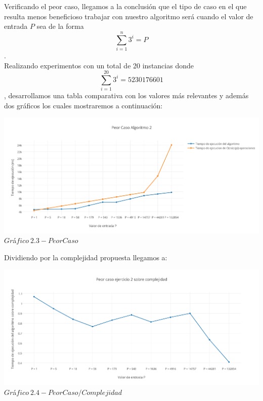 Verificando el peor caso, llegamos a la conclusi\'on que el tipo de caso en el que resulta menos beneficioso trabajar con nuestro algoritmo ser\'a cuando el valor de entrada $P$ sea de la forma \[
\sum_{i=1}^{n}3^{i}=P 
\].
\\

Realizando experimentos con un total de 20 instancias donde \[
\sum_{i=1}^{20}3^{i}=5230176601 
\], desarrollamos una tabla comparativa con los valores m\'as relevantes y adem\'as dos gr\'aficos los cuales mostraremos a continuaci\'on: \\

\vspace*{0.3cm} \vspace*{0.3cm}
  \begin{center}
 \includegraphics[scale=0.6]{./EJ2/peorcaso.png}
 {$Gr$\'a$fico \ 2.3 - Peor Caso$}
  \end{center}
  \vspace*{0.3cm}


Dividiendo por la complejidad propuesta llegamos a:\\

\vspace*{0.3cm} \vspace*{0.3cm}
  \begin{center}
 \includegraphics[scale=0.6]{./EJ2/peorcaso2.png}
 {$Gr$\'a$fico \ 2.4 - Peor Caso / Complejidad$}
  \end{center}
  \vspace*{0.3cm}

